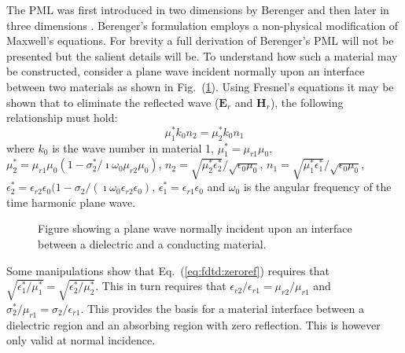 \documentclass[a4paper, 12pt]{article}
\newcommand{\eq}[1]{Eq.\ (\ref{#1})}
\newcommand{\rfig}[1]{Fig.\ (\ref{#1})}
\begin{document}
	The PML was first introduced in two dimensions by Berenger
	\cite{berenger94journcopmphys185} and then later in three dimensions
	\cite{berenger96journalcopmphys363}. Berenger's formulation employs a
	non-physical modification of Maxwell's equations. For brevity a full
	derivation of Berenger's PML will not be presented but the salient
	details will be. To understand how such a material may be constructed,
	consider a plane wave incident normally upon an interface between two
	materials as shown in \rfig{fig:fdtd:fresnel}. Using Fresnel's
	equations it may be shown that to eliminate the reflected wave
	($\mathbf{E}_r$ and $\mathbf{H}_r$), the following relationship must
	hold:
	\begin{equation}
		\label{eq:fdtd:zeroref}
		\mu^*_1k_0n_2=\mu_2^*k_0n_1
	\end{equation}
	where $k_0$ is the wave number in material 1, $\mu_1^*=\mu_{r1}\mu_0$,
	$\mu^*_2=\mu_{r1}\mu_0(1-\sigma_2^*/\imath\omega_0\mu_{r2}\mu_0)$,
	$n_2=\sqrt{\mu_2^*\epsilon_2^*}/\sqrt{\epsilon_0\mu_0}$,
	$n_1=\sqrt{\mu_1^*\epsilon_1^*}/\sqrt{\epsilon_0\mu_0}$,
	$\epsilon_2^*=\epsilon_{r2}\epsilon_0(1-\sigma_2/(\imath\omega_0\epsilon_{r2}\epsilon_0)$,
	$\epsilon^*_1=\epsilon_{r1}\epsilon_0$ and $\omega_0$ is the angular
	frequency of the time harmonic plane wave.
	\begin{figure}[!h]
		\centering
		\caption{Figure showing a plane wave normally incident upon an
			interface between a dielectric and a conducting material.}
		\label{fig:fdtd:fresnel}
	\end{figure}
	Some manipulations show that \eq{eq:fdtd:zeroref} requires that
	$\sqrt{\epsilon_1^*/\mu_1^*}=\sqrt{\epsilon_2^*/\mu_2^*}$. This in
	turn requires that $\epsilon_{r2}/\epsilon_{r1}=\mu_{r2}/\mu_{r1}$ and
	$\sigma_2^*/\mu_{r1}=\sigma_2/\epsilon_{r1}$. This provides the basis
	for a material interface between a dielectric region and an absorbing
	region with zero reflection. This is however only valid at normal
	incidence.
\end{document}
